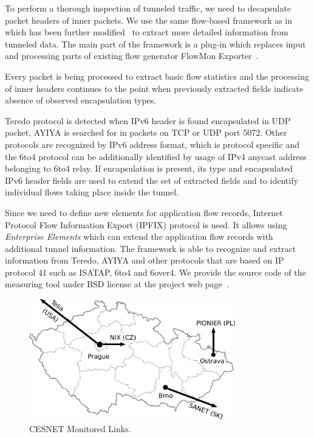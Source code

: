 To perform a thorough inspection of tunneled traffic, we need to decapsulate packet headers of inner packets. We use the same flow-based framework as in~\cite{Elich-2011-Monitoring} which has been further modified~\cite{Elich-2013-FlowMon} to extract more detailed information from tunneled data. The main part of the framework is a plug-in which replaces input and processing parts of existing flow generator FlowMon Exporter~\cite{FlowmonNetworks--Flowmon}. 

Every packet is being processed to extract basic flow statistics and the processing of inner headers continues to the point when previously extracted fields indicate absence of observed encapsulation types.

Teredo protocol is detected when IPv6 header is found encapsulated in UDP packet, AYIYA is searched for in packets on TCP or UDP port 5072. Other protocols are recognized by IPv6 address format, which is protocol specific and the 6to4 protocol can be additionally identified by usage of IPv4 anycast address belonging to 6to4 relay. If encapsulation is present, its type and encapsulated IPv6 header fields are used to extend the set of extracted fields and to identify individual flows taking place inside the tunnel. 

Since we need to define new elements for application flow records, Internet Protocol Flow Information Export (IPFIX) protocol is used. It allows using \emph{Enterprise Elements} which can extend the application flow records with additional tunnel information. 
The framework is able to recognize and extract information from Teredo, AYIYA and other protocols that are based on IP protocol 41 such as ISATAP, 6to4 and 6over4. 
We provide the source code of the measuring tool under BSD license at the project web page~\cite{Elich-2013-FlowMon}.

\begin{figure}[!tb]
\centering
\includegraphics[width=0.8\textwidth]{figures/paper-tunnels/cesnet-map}
\caption{CESNET Monitored Links.}
\label{fig:ipv6-tunnels-topology}
\end{figure}

